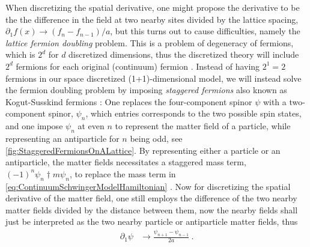\documentclass[../main.tex]{subfiles} %
\begin{document}
When discretizing the spatial derivative, one might propose the derivative to be the the difference in the field at two nearby sites divided by the lattice spacing, $\partial_1 f(x) \rightarrow (f_n - f_{n - 1}) / a$, but this turns out to cause difficulties, namely the \emph{lattice fermion doubling} problem. This is a problem of degeneracy of fermions, which is $2^d$ for $d$ discretized dimensions, thus the discretized theory will include $2^d$ fermions for each original (continuum) fermion \cite{GoswamiBandyopadhyay_FermionDoubling_1997}. Instead of having $2^1 = 2$ fermions in our space discretized (1+1)-dimensional model, we will instead solve the fermion doubling problem by imposing \emph{staggered fermions} also known as Kogut-Susskind fermions \cite{susskind_latticeFermions_1977, banksSusskindKogut_StrongCoupling_1976}: One replaces the four-component spinor $\psi$ with a two-component spinor, $\psi_n$, which entries corresponds to the two possible spin states, and one impose $\psi_n$ at even $n$ to represent the matter field of a particle, while representing an antiparticle for $n$ being odd, see \cref{fig:StaggeredFermionsOnALattice}. By representing either a particle or an antiparticle, the matter fields necessitates a staggered mass term, $(-1)^n \psi_n\dagger m \psi_n$, to replace the mass term in \cref{eq:ContinuumSchwingerModelHamiltonian} \cite{susskind_latticeFermions_1977}. Now for discretizing the spatial derivative of the matter field, one still employs the difference of the two nearby matter fields divided by the distance between them, now the nearby fields shall just be interpreted as the two nearby particle or antiparticle matter fields, thus \cite{susskind_latticeFermions_1977}
\begin{align}
    \partial_1 \psi &\rightarrow \frac{\psi_{n+1} - \psi_{n-1}}{2a} \: .
\end{align}
\end{document}
